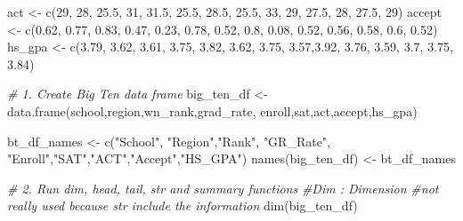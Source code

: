 \documentclass[
]{article}
\newenvironment{Shaded}{\begin{snugshade}}{\end{snugshade}}
\newcommand{\CommentTok}[1]{\textcolor[rgb]{0.56,0.35,0.01}{\textit{#1}}}
\newcommand{\DecValTok}[1]{\textcolor[rgb]{0.00,0.00,0.81}{#1}}
\newcommand{\FloatTok}[1]{\textcolor[rgb]{0.00,0.00,0.81}{#1}}
\newcommand{\FunctionTok}[1]{\textcolor[rgb]{0.00,0.00,0.00}{#1}}
\newcommand{\NormalTok}[1]{#1}
\newcommand{\OtherTok}[1]{\textcolor[rgb]{0.56,0.35,0.01}{#1}}
\newcommand{\StringTok}[1]{\textcolor[rgb]{0.31,0.60,0.02}{#1}}
\begin{document}
\begin{Shaded}
\begin{Highlighting}[]
\NormalTok{act }\OtherTok{\textless{}{-}} \FunctionTok{c}\NormalTok{(}\DecValTok{29}\NormalTok{, }\DecValTok{28}\NormalTok{, }\FloatTok{25.5}\NormalTok{, }\DecValTok{31}\NormalTok{, }\FloatTok{31.5}\NormalTok{, }\FloatTok{25.5}\NormalTok{, }\FloatTok{28.5}\NormalTok{, }\FloatTok{25.5}\NormalTok{, }
         \DecValTok{33}\NormalTok{, }\DecValTok{29}\NormalTok{, }\FloatTok{27.5}\NormalTok{, }\DecValTok{28}\NormalTok{, }\FloatTok{27.5}\NormalTok{, }\DecValTok{29}\NormalTok{)}
\NormalTok{accept }\OtherTok{\textless{}{-}} \FunctionTok{c}\NormalTok{(}\FloatTok{0.62}\NormalTok{, }\FloatTok{0.77}\NormalTok{, }\FloatTok{0.83}\NormalTok{, }\FloatTok{0.47}\NormalTok{, }\FloatTok{0.23}\NormalTok{, }\FloatTok{0.78}\NormalTok{, }\FloatTok{0.52}\NormalTok{, }
            \FloatTok{0.8}\NormalTok{, }\FloatTok{0.08}\NormalTok{, }\FloatTok{0.52}\NormalTok{, }\FloatTok{0.56}\NormalTok{, }\FloatTok{0.58}\NormalTok{, }\FloatTok{0.6}\NormalTok{, }\FloatTok{0.52}\NormalTok{)}
\NormalTok{hs\_gpa }\OtherTok{\textless{}{-}} \FunctionTok{c}\NormalTok{(}\FloatTok{3.79}\NormalTok{, }\FloatTok{3.62}\NormalTok{, }\FloatTok{3.61}\NormalTok{, }\FloatTok{3.75}\NormalTok{, }\FloatTok{3.82}\NormalTok{, }\FloatTok{3.62}\NormalTok{, }\FloatTok{3.75}\NormalTok{,}
            \FloatTok{3.57}\NormalTok{,}\FloatTok{3.92}\NormalTok{, }\FloatTok{3.76}\NormalTok{, }\FloatTok{3.59}\NormalTok{, }\FloatTok{3.7}\NormalTok{, }\FloatTok{3.75}\NormalTok{, }\FloatTok{3.84}\NormalTok{)}

\CommentTok{\# 1. Create Big Ten data frame}
\NormalTok{big\_ten\_df }\OtherTok{\textless{}{-}} \FunctionTok{data.frame}\NormalTok{(school,region,wn\_rank,grad\_rate,}
\NormalTok{                         enroll,sat,act,accept,hs\_gpa)}
        
\NormalTok{bt\_df\_names }\OtherTok{\textless{}{-}} \FunctionTok{c}\NormalTok{(}\StringTok{"School"}\NormalTok{, }\StringTok{"Region"}\NormalTok{,}\StringTok{"Rank"}\NormalTok{, }\StringTok{"GR\_Rate"}\NormalTok{,}
                 \StringTok{"Enroll"}\NormalTok{,}\StringTok{"SAT"}\NormalTok{,}\StringTok{"ACT"}\NormalTok{,}\StringTok{"Accept"}\NormalTok{,}\StringTok{"HS\_GPA"}\NormalTok{)}
\FunctionTok{names}\NormalTok{(big\_ten\_df) }\OtherTok{\textless{}{-}}\NormalTok{ bt\_df\_names}


\CommentTok{\# 2. Run dim, head, tail, str and summary functions}
\CommentTok{\#Dim : Dimension }
\CommentTok{\#not really used because str include the information }
\FunctionTok{dim}\NormalTok{(big\_ten\_df)}
\end{Highlighting}
\end{Shaded}
\end{document}
